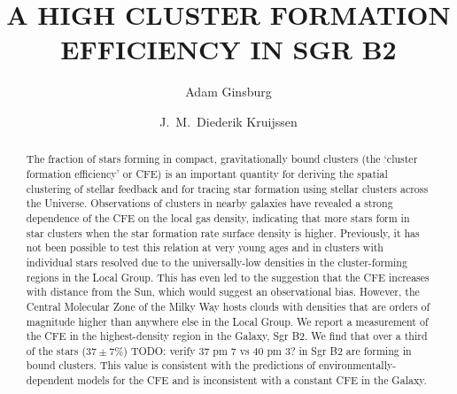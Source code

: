 \documentclass[twocolumn]{aastex62}
\begin{document}
\title{A HIGH CLUSTER FORMATION EFFICIENCY IN SGR B2}


\author{Adam Ginsburg}

\author{J.~M.\ Diederik Kruijssen}



\begin{abstract}
    The fraction of stars forming in compact, gravitationally bound clusters
    (the `cluster formation efficiency' or CFE) is an important quantity for
    deriving the spatial clustering of stellar feedback and for tracing star
    formation using stellar clusters across the Universe.  Observations of
    clusters in nearby galaxies have revealed a strong dependence of the CFE on
    the local gas density, indicating that more stars form in star clusters
    when the star formation rate surface density is higher. Previously, it has
    not been possible to test this relation at very young ages and in clusters
    with individual stars resolved due to the universally-low densities in the
    cluster-forming regions in the Local Group. This has even led to the
    suggestion that the CFE increases with distance from the Sun, which would
    suggest an observational bias.  However, the Central Molecular Zone of the
    Milky Way hosts clouds with densities that are orders of magnitude higher
    than anywhere else in the Local Group.  We report a measurement of the CFE
    in the highest-density region in the Galaxy, Sgr B2.  We find that over a
    third of the stars ($37\pm7\%$) {\color{red}TODO: verify 37 pm 7 vs 40 pm 3?} in Sgr B2 are forming in bound clusters.
    This value is consistent with the predictions of environmentally-dependent
    models for the CFE and is inconsistent with a constant CFE in the
    Galaxy.
    \vspace{10mm}
\end{abstract}
\end{document}
